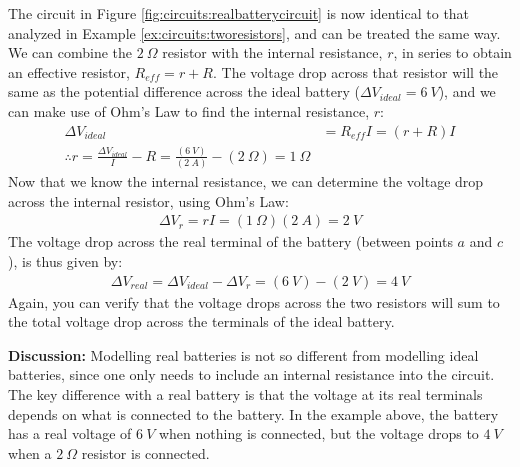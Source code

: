 \begin{example}
The circuit in Figure \ref{fig:circuits:realbatterycircuit} is now identical to that analyzed in Example \ref{ex:circuits:tworesistors}, and can be treated the same way. We can combine the $\SI{2}{\Omega}$ resistor with the internal resistance, $r$, in series to obtain an effective resistor, $R_{eff}=r+R$. The voltage drop across that resistor will the same as the potential difference across the ideal battery ($\Delta V_{ideal}=\SI{6}{V}$), and we can make use of Ohm's Law to find the internal resistance, $r$:
\begin{align*}
\Delta V_{ideal}&= R_{eff}I=(r+R)I\\
\therefore r = \frac{\Delta V_{ideal}}{I}-R=\frac{(\SI{6}{V})}{(\SI{2}{A})}-(\SI{2}{\Omega})=\SI{1}{\Omega}
\end{align*}
Now that we know the internal resistance, we can determine the voltage drop across the internal resistor, using Ohm's Law:
\begin{align*}
\Delta V_r = rI=(\SI{1}{\Omega})(\SI{2}{A})=\SI{2}{V}
\end{align*}
The voltage drop across the real terminal of the battery (between points $a$ and $c$), is thus given by:
\begin{align*}
\Delta V_{real}=\Delta V_{ideal}-\Delta V_r=(\SI{6}{V})-(\SI{2}{V})=\SI{4}{V}
\end{align*}
Again, you can verify that the voltage drops across the two resistors will sum to the total voltage drop across the terminals of the ideal battery. 


\textbf{Discussion: } Modelling real batteries is not so different from modelling ideal batteries, since one only needs to include an internal resistance into the circuit. The key difference with a real battery is that the voltage at its real terminals depends on what is connected to the battery. In the example above, the battery has a real voltage of $\SI{6}{V}$ when nothing is connected, but the voltage drops to $\SI{4}{V}$ when a $\SI{2}{\Omega}$ resistor is connected.
\end{example}


